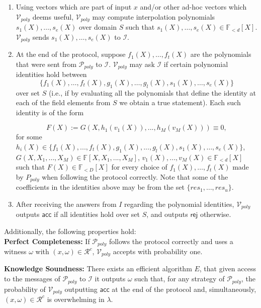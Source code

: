 \begin{dfn}
\begin{enumerate}
\item 
Using vectors which are part of input $x$ and/or other ad-hoc vectors which $\mathcal{V}_{poly}$ deems useful, $\mathcal{V}_{poly}$ 
may compute interpolation polynomials $s_1(X), \ldots, s_e(X)$ over domain $S$ such that $s_1(X), \ldots, s_e(X) \in \mathbb{F}_{<d}[X]$. 
$\mathcal{V}_{poly}$ sends $s_1(X), \ldots, s_e(X)$ to $\mathcal{I}$. 

\item 
At the end of the protocol, suppose $f_1(X), \ldots, f_t(X)$ are the polynomials that were sent from $\mathcal{P}_{poly}$ to 
$\mathcal{I}$. $\mathcal{V}_{poly}$ may ask $\mathcal{I}$ if certain polynomial identities hold between 
$$\{f_1(X), \ldots , f_t(X), g_1(X), \ldots, g_l(X), s_1(X), \ldots, s_e(X) \}$$ over set $S$ 
(i.e., if by evaluating all the polynomials that define the identity at each of the field elements from $S$ 
we obtain a true statement). Each such identity is of the form 

$$F(X) := G(X, h_1(v_1(X)), . . . , h_M(v_M(X))) \equiv 0,$$
for some $h_i(X) \in \{f_1(X), . . . , f_t(X), g_1(X), . . . , g_l(X), s_1(X), \ldots, s_e(X) \}$, \\ $G(X, X_1, \ldots, X_M) \in \mathbb{F}[X, X_1, . . . , X_M]$, 
$v_1(X), . . . , v_M(X) \in  \mathbb{F}_{<d}[X]$ such that $F(X) \in \mathbb{F}_{<D}[X]$ for every choice of 
$f_1(X), \ldots, f_t(X)$ made by $P_{poly}$ when following the protocol correctly. Note that some of the coefficients in the identities above may be 
from the set $\{\mathit{res_1}, \ldots, \mathit{res_u}\}$.
\item After receiving the answers from $I$ regarding the polynomial identities, 
$\mathcal{V}_{poly}$ outputs $\mathsf{acc}$ if all identities hold over set $S$, 
and outputs $\mathsf{rej}$ otherwise.
\end{enumerate}

\noindent Additionally, the following properties hold: \\

\noindent \textbf{Perfect Completeness:} If $\mathcal{P}_{poly}$ follows the protocol correctly and uses a witness $\omega$ with 
$(x, \omega) \in \mathcal{R}^c$, $\mathcal{V}_{poly}$ accepts with probability one.

\noindent \textbf{Knowledge Soundness:} There exists an efficient algorithm $E$, that given access to the messages of $\mathcal{P}_{poly}$ 
to $\mathcal{I}$ it outputs $\omega$ such that, for any strategy of $\mathcal{P}_{poly}$, the probability of $\mathcal{V}_{poly}$ 
outputting $\mathsf{acc}$ at the end of the protocol and, simultaneously, $(x, \omega) \in \mathcal{R}^c$ is overwhelming in $\lambda$.

\end{dfn}

